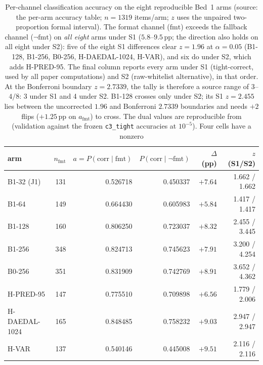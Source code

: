 \documentclass{article}
\newcommand{\pp}{\,\mathrm{pp}}
\begin{document}
\begin{table}[!tb]
\centering\footnotesize
\setlength{\tabcolsep}{3pt}
\begin{tabular}{@{}lrrrrr@{}}
\toprule
arm & $n_{\mathrm{fmt}}$ & $a{=}P(\mathrm{corr}\mid\mathrm{fmt})$ &
$P(\mathrm{corr}\mid\neg\mathrm{fmt})$ & $\Delta$ (pp) & $z$ (S1/S2) \\
\midrule
\textsc{B1-32} (J1) & 131 & 0.526718 & 0.450337 & $+7.64$ & 1.662 / 1.662 \\
\textsc{B1-64} & 149 & 0.664430 & 0.605983 & $+5.84$ & 1.417 / 1.417 \\
\textsc{B1-128} & 160 & 0.806250 & 0.723037 & $+8.32$ & 2.455 / 3.445 \\
\textsc{B1-256} & 348 & 0.824713 & 0.745623 & $+7.91$ & 3.200 / 4.254 \\
\textsc{B0-256} & 351 & 0.831909 & 0.742769 & $+8.91$ & 3.652 / 4.362 \\
\textsc{H-PRED-95} & 147 & 0.775510 & 0.709898 & $+6.56$ & 1.779 / 2.006 \\
\textsc{H-DAEDAL-1024} & 165 & 0.848485 & 0.758232 & $+9.03$ & 2.947 / 2.947 \\
\textsc{H-VAR} & 137 & 0.540146 & 0.445008 & $+9.51$ & 2.116 / 2.116 \\
\bottomrule
\end{tabular}
\caption{Per-channel classification accuracy on the eight reproducible Bed~1
arms (source: the per-arm accuracy table;
$n{=}1319$ items/arm;
$z$ uses the unpaired two-proportion formal interval).  The format
channel ($\mathrm{fmt}$) exceeds the fallback channel
($\neg\mathrm{fmt}$) on \emph{all eight} arms under S1 ($5.8$--$9.5\pp$; the
direction also holds on all eight under S2): five of the eight S1 differences
clear $z{=}1.96$ at $\alpha{=}0.05$
(\textsc{B1-128}, \textsc{B1-256}, \textsc{B0-256},
\textsc{H-DAEDAL-1024}, \textsc{H-VAR}), and six do under S2, which adds
\textsc{H-PRED-95}.  The final column reports every arm
under S1 (tight-correct, used by all paper computations) and S2
(raw-whitelist alternative), in that order.  At the Bonferroni boundary
$z{=}2.7339$, the tally is therefore a source range of $3$--$4/8$: 3 under S1
and 4 under S2.  \textsc{B1-128} crosses only under S2; its S1 $z{=}2.455$
lies between the uncorrected $1.96$ and Bonferroni $2.7339$ boundaries and
needs $+2$ flips ($+1.25\pp$ on $a_{\mathrm{fmt}}$) to cross.
The dual values are reproducible from
\protect{} (validation against the frozen
\texttt{c3\_tight} accuracies at $10^{-5}$).  Four cells have a nonzero
}
\end{table}
\end{document}
